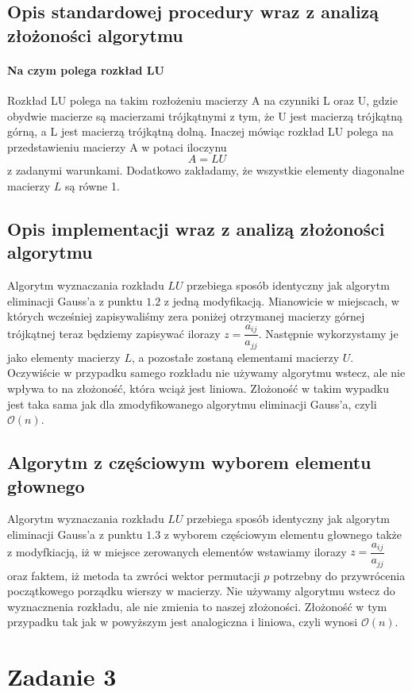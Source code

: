 \documentclass[11pt]{article}
\begin{document}
\begin{flushleft}
\subsection{Opis standardowej procedury wraz z analizą złożoności algorytmu}
\paragraph{Na czym polega rozkład LU} Rozkład LU polega na takim rozłożeniu macierzy A na czynniki L oraz U, gdzie obydwie macierze są macierzami trójkątnymi z tym, że U jest macierzą trójkątną górną, a L jest macierzą trójkątną dolną. Inaczej mówiąc rozkład LU polega na przedstawieniu macierzy A w potaci iloczynu $$A = LU$$ z zadanymi warunkami. Dodatkowo zakładamy, że wszystkie elementy diagonalne macierzy $L$ są równe 1.\\ 
\subsection{Opis implementacji wraz z analizą złożoności algorytmu}
Algorytm wyznaczania rozkładu $LU$ przebiega sposób identyczny jak algorytm eliminacji Gauss'a z punktu $1.2$ z jedną modyfikacją. Mianowicie w miejscach, w których wcześniej zapisywaliśmy zera poniżej otrzymanej macierzy górnej trójkątnej teraz będziemy zapisywać ilorazy $z = \dfrac{a_{ij}}{a_{jj}} $. Następnie wykorzystamy je jako elementy macierzy $L$, a pozostałe zostaną elementami macierzy $U$. Oczywiście w przypadku samego rozkładu nie używamy algorytmu wstecz, ale nie wpływa to na złożoność, która wciąż jest liniowa. Złożoność w takim wypadku jest taka sama jak dla zmodyfikowanego algorytmu eliminacji Gauss'a, czyli $\mathcal{O}(n)$.
\subsection{Algorytm z częściowym wyborem elementu głownego}
Algorytm wyznaczania rozkładu $LU$ przebiega sposób identyczny jak algorytm eliminacji Gauss'a z punktu $1.3$ z wyborem częściowym elementu głownego także z modyfkiacją, iż w miejsce zerowanych elementów wstawiamy ilorazy $z = \dfrac{a_{ij}}{a_{jj}} $ oraz faktem, iż metoda ta zwróci wektor permutacji $p$ potrzebny do przywrócenia początkowego porządku wierszy w macierzy. Nie używamy algorytmu wstecz do wyznacznenia rozkładu, ale nie zmienia to naszej złożoności. Złożoność w tym przypadku tak jak w powyższym jest analogiczna i liniowa, czyli wynosi  $\mathcal{O}(n)$.
\section{Zadanie 3}

\end{flushleft}
\end{document}
